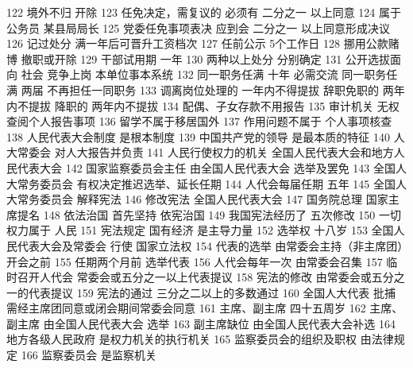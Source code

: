 \documentclass[cyan]{elegantnote}
\begin{document}
\begin{enumerate}
122 境外不归 开除
123 任免决定，需复议的 必须有 二分之一 以上同意
124 属于公务员 某县局局长
125 党委任免事项表决 应到会 二分之一 以上同意形成决议
126 记过处分 满一年后可晋升工资档次
127 任前公示 5个工作日
128 挪用公款赌博 撤职或开除
129 干部试用期 一年
130 两种以上处分 分别确定
131 公开选拔面向 社会 竞争上岗 本单位事本系统
132 同一职务任满 十年 必需交流 同一职务任满 两届 不再担任一同职务
133 调离岗位处理的 一年内不得提拔
辞职免职的 两年内不提拔
降职的 两年内不提拔
134 配偶、子女存款不用报告
135 审计机关 无权查阅个人报告事项
136 留学不属于移居国外
137 作用问题不属于 个人事项核查
138 人民代表大会制度 是根本制度
139 中国共产党的领导 是最本质的特征
140 人大常委会 对人大报告并负责
141 人民行使权力的机关 全国人民代表大会和地方人民代表大会
142 国家监察委员会主任 由全国人民代表大会 选举及罢免
143 全国人大常务委员会 有权决定推迟选举、延长任期
144 人代会每届任期 五年
145 全国人大常务委员会 解释宪法
146 修改宪法 全国人民代表大会
147 国务院总理 国家主席提名
148 依法治国 首先坚持 依宪治国
149 我国宪法经历了 五次修改
150 一切权力属于 人民
151 宪法规定 国有经济 是主导力量
152 选举权 十八岁
153 全国人民代表大会及常委会 行使 国家立法权
154 代表的选举 由常委会主持（非主席团）开会之前
155 任期两个月前 选举代表
156 人代会每年一次 由常委会召集
157 临时召开人代会 常委会或五分之一以上代表提议
158 宪法的修改 由常委会或五分之一的代表提议
159 宪法的通过 三分之二以上的多数通过
160 全国人大代表 批捕 需经主席团同意或闭会期间常委会同意
161 主席、副主席 四十五周岁
162 主席、副主席 由全国人民代表大会 选举
163 副主席缺位 由全国人民代表大会补选
164 地方各级人民政府 是权力机关的执行机关
165 监察委员会的组织及职权 由法律规定
166 监察委员会 是监察机关
\end{enumerate}
\end{document}
